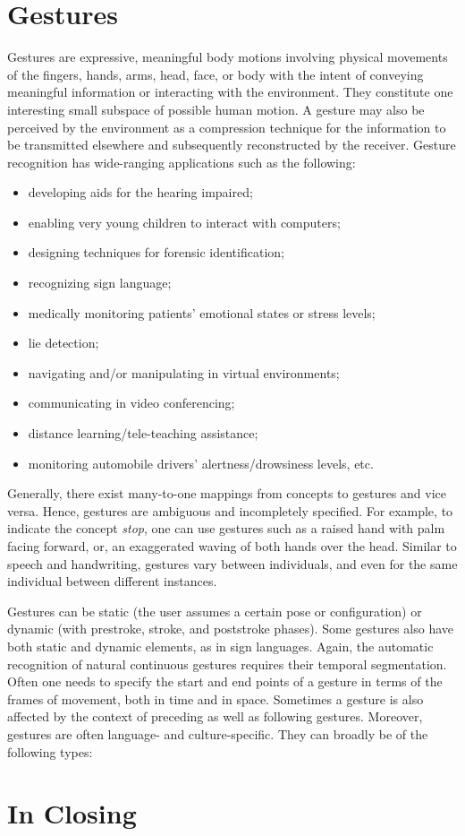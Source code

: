 
\section{Gestures}
Gestures are expressive, meaningful body motions involving
physical movements of the fingers, hands, arms, head, face, or
body with the intent of conveying meaningful information
or interacting with the environment. They constitute one interesting
small subspace of possible human motion. A gesture
may also be perceived by the environment as a compression
technique for the information to be transmitted elsewhere and
subsequently reconstructed by the receiver. Gesture recognition
has wide-ranging applications such as the following:
\begin{itemize}
\item developing aids for the hearing impaired;
\item  enabling very young children to interact with computers;
\item  designing techniques for forensic identification;
\item recognizing sign language;
\item medically monitoring patients’ emotional states or stress
levels;
\item lie detection;
\item navigating and/or manipulating in virtual environments;
\item communicating in video conferencing;
\item distance learning/tele-teaching assistance;
\item monitoring automobile drivers' alertness/drowsiness
levels, etc.
\end{itemize}

Generally, there exist many-to-one mappings from concepts
to gestures and vice versa. Hence, gestures are ambiguous and
incompletely specified. For example, to indicate the concept
\textit{stop}, one can use gestures such as a raised hand with palm
facing forward, or, an exaggerated waving of both hands over the
head. Similar to speech and handwriting, gestures vary between
individuals, and even for the same individual between different
instances.

Gestures can be static (the user assumes a certain pose or configuration)
or dynamic (with prestroke, stroke, and poststroke
phases). Some gestures also have both static and dynamic elements,
as in sign languages. Again, the automatic recognition
of natural continuous gestures requires their temporal segmentation.
Often one needs to specify the start and end points of a
gesture in terms of the frames of movement, both in time and
in space. Sometimes a gesture is also affected by the context of
preceding as well as following gestures. Moreover, gestures are
often language- and culture-specific. They can broadly be of the
following types:


\section{In Closing}
